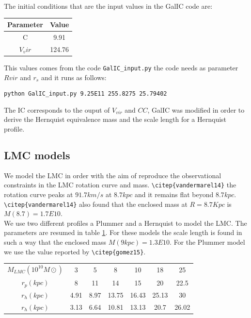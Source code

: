 The initial conditions that are the input values in the GalIC code are:

\begin{table}
\begin{tabular}{c c}
\hline
Parameter & Value \\
\hline
C & 9.91 \\
$V_vir$ & 124.76\\
\end{tabular}
\end{table}

This values comes from the code \verb+GalIC_input.py+ the code needs as parameter 
$Rvir$ and $r_s$ and it runs as follows:

\begin{verbatim}
python GalIC_input.py 9.25E11 255.8275 25.79402
\end{verbatim}

The IC corresponds to the ouput of $V_{vir}$ and $CC$, GalIC was modified 
in order to derive the Hernquist equivalence mass and the scale length for a
Hernquist profile.


\subsection{LMC models}

We model the LMC in order with the aim of reproduce the observational 
constraints in the LMC rotation curve and mass. \verb+\citep{vandermarel14}+
the rotation curve peaks at $91.7 km/s$ at $8.7 kpc$ and it remains flat 
beyond $8.7 kpc$. \verb+\citep{vandermarel14}+ also found that the enclosed
mass at $R = 8.7Kpc$ is $M(8.7) = 1.7E10$.\\

We use two different profiles a Plummer and a Hernquist to model the 
LMC. The parameters are resumed in table \ref{tab:LMC}. For these 
models the scale length is found in such a way that the enclosed 
mass  $M(9kpc) = 1.3E10$. For the Plummer model we use the value
reported by \verb+\citep{gomez15}+.



\begin{table}[H]{\label{tab:LMC}}
\begin{center}
\begin{tabular}{c c c c c c c}
\hline
\hline
$M_{LMC} (10^10M\odot)$ & 3 & 5 & 8 & 10 & 18 & 25 \\
$r_p(kpc)$ & 8 & 11 & 14 & 15 & 20 & 22.5 \\
$r_h(kpc)$ & 4.91 & 8.97 & 13.75 & 16.43 & 25.13 & 30 \\
$r_h(kpc)$ & 3.13 & 6.64 & 10.81 & 13.13 & 20.7 & 26.02 \\
\hline
\end{tabular}
\end{center}
\end{table}

